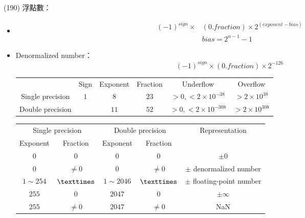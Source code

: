 \item \begin{theorem}{(190)} 浮點數： \begin{itemize}
        \item \begin{equation}
            \begin{aligned}
                (-1)^{sign} \times & (0.fraction) \times 2^{(exponent - bias)} \\
                & bias = 2^{n - 1} - 1
            \end{aligned}
        \end{equation}
        \item Denormalized number：\begin{equation}
            (-1)^{sign} \times (0.fraction) \times 2^{-126}
        \end{equation}
        \begin{table}[H]
            \centering
            \begin{tabular}{|c|c|c|c|c|c|}
                \hline
                & Sign & Exponent & Fraction & Underflow & Overflow \\
                \Xhline{2\arrayrulewidth}
                Single precision & \multirow{2}{*}{$1$} & $8$ & $23$ & $>0, < 2 \times 10^{-38}$ & $> 2 \times 10^{38}$ \\
                \cline{1-1}\cline{3-6}
                Double precision &  & $11$ & $52$ & $>0, < 2 \times 10^{-308}$ & $> 2 \times 10^{308}$ \\
                \hline
            \end{tabular}
        \end{table}
        \begin{table}[H]
            \centering
            \begin{tabular}{|c|c|c|c|c|}
                \hline
                \multicolumn{2}{|c|}{Single precision} & \multicolumn{2}{c|}{Double precision} & Representation \\
                \Xhline{2\arrayrulewidth}
                Exponent & Fraction & Exponent & Fraction & \\
                \hline
                $0$ & $0$ & $0$ & $0$ & $\pm 0$ \\
                \hline
                $0$ & $\neq 0$ & $0$ & $\neq 0$ & $\pm$ denormalized number \\
                \hline
                $1 \sim 254$ & $\texttimes$ & $1 \sim 2046$ & $\texttimes$ & $\pm$ floating-point number \\
                \hline
                $255$ & $0$ & $2047$ & $0$ & $\pm \infty$ \\
                \hline
                $255$ & $\neq 0$ & $2047$ & $\neq 0$ & NaN \\
                \hline
            \end{tabular}
        \end{table}
    \end{itemize}
\end{theorem}

